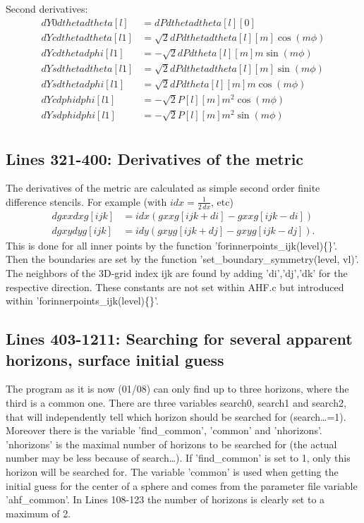 \documentclass[11pt,a4paper,twoside]{article}
\begin{document}
Second derivatives:
\begin{align}
  dY0dthetadtheta[l]&=dPdthetadtheta[l][0]\\
  dYcdthetadtheta[l1]&= \sqrt{2} dPdthetadtheta[l][m] \cos (m\phi)\\
  dYcdthetadphi[l1]  &=-\sqrt{2} dPdtheta[l][m] m \sin (m\phi)\\  
  dYsdthetadtheta[l1]&= \sqrt{2} dPdthetadtheta[l][m] \sin (m\phi)\\
  dYsdthetadphi[l1]  &= \sqrt{2} dPdtheta[l][m] m \cos (m \phi)\\
  dYcdphidphi[l1]    &=-\sqrt{2} P[l][m] m^2 \cos (m \phi)\\
  dYsdphidphi[l1]    &=-\sqrt{2} P[l][m] m^2 \sin (m \phi)\\
\end{align}

\subsection{Lines 321-400: Derivatives of the metric}
The derivatives of the metric are calculated as simple second order
finite difference stencils. For example (with $idx=\frac 1 {2 \,dx}$, etc)
\begin{align}
  dgxxdxg[ijk] &= idx (gxxg[ijk+di] - gxxg[ijk-di])\\
  dgxydyg[ijk] &= idy (gxyg[ijk+dj] - gxyg[ijk-dj]).
\end{align}  
This is done for all inner points by the function 'forinnerpoints\_ijk(level)\{\}'.
Then the boundaries are set by the function 'set\_boundary\_symmetry(level, vl)'.
The neighbors of the 3D-grid index ijk are found by
adding 'di','dj','dk' for the respective direction.
These constants are not set within AHF.c but introduced within
'forinnerpoints\_ijk(level)\{\}'. 

\subsection{Lines 403-1211: Searching for several apparent horizons, surface initial guess}
The program as it is now (01/08) can only find up to three horizons, where
the third is a common one.
There are three variables search0, search1 and search2, that will independently
tell which horizon should be searched for (search\dots=1). Moreover there is the 
variable 'find\_common', 'common' and 'nhorizons'. 'nhorizons' is the maximal number of 
horizons to be searched for (the actual number may be less because of search\dots).
If 'find\_common' is set to 1, only this horizon will be searched for.
The variable 'common' is used when getting the initial guess for the center of a 
sphere and comes from the parameter file variable 'ahf\_common'.
In Lines 108-123 the number of horizons is clearly set to a maximum of 2.
\end{document}

